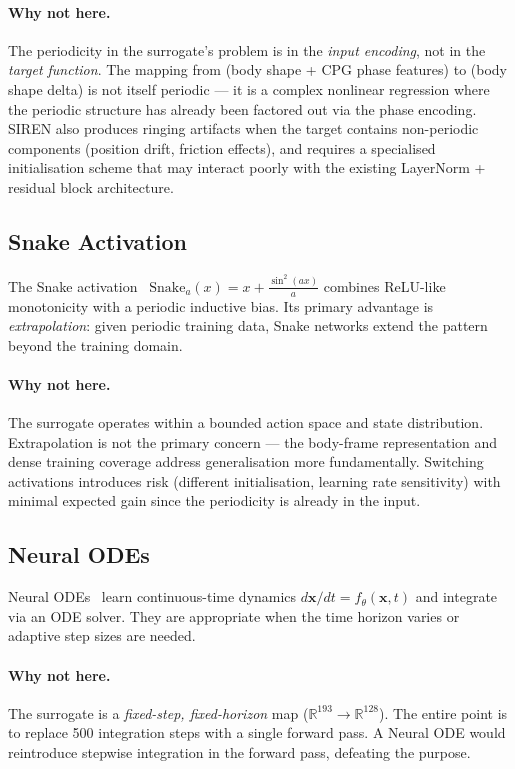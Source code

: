 \documentclass[11pt]{article}
\newcommand{\vect}[1]{\mathbf{#1}}
\newcommand{\Real}{\mathbb{R}}
\begin{document}
\paragraph{Why not here.}
The periodicity in the surrogate's problem is in the \emph{input encoding},
not in the \emph{target function}.
The mapping from (body shape + CPG phase features) to (body shape delta)
is not itself periodic --- it is a complex nonlinear regression where the periodic
structure has already been factored out via the phase encoding.
SIREN also produces ringing artifacts when the target contains non-periodic
components (position drift, friction effects), and requires a specialised
initialisation scheme that may interact poorly with the existing LayerNorm + residual
block architecture.

\subsection{Snake Activation}

The Snake activation~\cite{ziyin2020neural}
$\mathrm{Snake}_a(x) = x + \tfrac{\sin^2(ax)}{a}$ combines ReLU-like monotonicity
with a periodic inductive bias.
Its primary advantage is \emph{extrapolation}: given periodic training data,
Snake networks extend the pattern beyond the training domain.

\paragraph{Why not here.}
The surrogate operates within a bounded action space and state distribution.
Extrapolation is not the primary concern --- the body-frame representation and
dense training coverage address generalisation more fundamentally.
Switching activations introduces risk (different initialisation, learning rate
sensitivity) with minimal expected gain since the periodicity is already in the input.

\subsection{Neural ODEs}

Neural ODEs~\cite{chen2018neuralode} learn continuous-time dynamics
$d\vect{x}/dt = f_\theta(\vect{x}, t)$ and integrate via an ODE solver.
They are appropriate when the time horizon varies or adaptive step sizes are needed.

\paragraph{Why not here.}
The surrogate is a \emph{fixed-step, fixed-horizon} map
($\Real^{193} \to \Real^{128}$).
The entire point is to replace 500 integration steps with a single forward pass.
A Neural ODE would reintroduce stepwise integration in the forward pass,
defeating the purpose.
\end{document}
